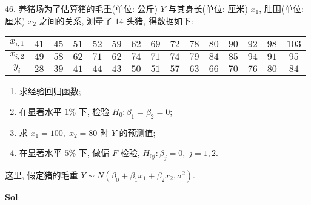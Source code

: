 \vspace{12pt}


46. 养猪场为了估算猪的毛重(单位: 公斤) $Y$ 与其身长(单位: 厘米) $x_1$, 肚围(单位: 厘米) $x_2$ 之间的关系, 测量了 $14$ 头猪, 得数据如下:

\begin{center}
    \begin{tabular}{c|cccccccccccccc}
        \hline
        $x_{i,1}$ & $41$ & $45$ & $51$ & $52$ & $59$ & $62$ & $69$ & $72$ & $78$ & $80$ & $90$ & $92$ & $98$ & $103$\\
        \hline
        $x_{i,2}$ & $49$ & $58$ & $62$ & $71$ & $62$ & $74$ & $71$ & $74$ & $79$ & $84$ & $85$ & $94$ & $91$ & $95$\\ 
        \hline
        $y_{i}$   & $28$ & $39$ & $41$ & $44$ & $43$ & $50$ & $51$ & $57$ & $63$ & $66$ & $70$ & $76$ & $80$ & $84$\\
        \hline
    \end{tabular}
\end{center}

\begin{enumerate}[(1)]
    \item 求经验回归函数;
    \item 在显著水平 $1\%$ 下, 检验 $H_0:\beta_1=\beta_2=0$;
    \item 求 $x_1=100,\;x_2=80$ 时 $Y$ 的预测值;
    \item 在显著水平 $5\%$ 下, 做偏 $F$ 检验, $H_{0j}:\beta_j=0,\;j=1,2$.
\end{enumerate}

这里, 假定猪的毛重 $Y\sim N(\beta_0+\beta_1x_1+\beta_2x_2,\sigma^2)$.

\textbf{Sol}:  

